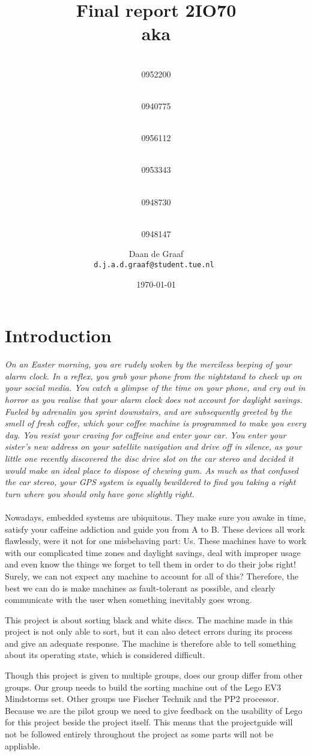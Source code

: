 \documentclass[a4paper,oneside,11pt]{report}
\title{\vspace{-\baselineskip}\sffamily\bfseries \Huge{ Final report 2IO70}
\small \\aka \\ \naam
}
\author{
	\makebox[.25\linewidth]{Sergio van Amerongen}\\0952200 \and
	\makebox[.25\linewidth]{Stefan Cloudt}\\0940775 \and
	\makebox[.25\linewidth]{Daan de Graaf}\\0956112 \and
	\makebox[.25\linewidth]{Robert van Lente}\\0953343 \and
	\makebox[.25\linewidth]{Tom Peters}\\0948730 \and
	\makebox[.25\linewidth]{Berrie Trippe}\\0948147 
	\and \makebox[.75\linewidth]{\textbf{Responsible:}} \and
	Daan de Graaf\\ \tt{d.j.a.d.graaf@student.tue.nl}
}
\date{\today}
\begin{document}
\maketitle

\tableofcontents
\newpage

\chapter{Introduction}
\textit{
On an Easter morning, you are rudely woken by the merciless beeping of your alarm clock. In a reflex, you grab your phone from the nightstand to check up on your social media. You catch a glimpse of the time on your phone, and cry out in horror as you realise that your alarm clock does not account for daylight savings. Fueled by adrenalin you sprint downstairs, and are subsequently greeted by the smell of fresh coffee, which your coffee machine is programmed to make you every day. You resist your craving for caffeine and enter your car. You enter your sister's new address on your satellite navigation and drive off in silence, as your little one recently discovered the disc drive slot on the car stereo and decided it would make an ideal place to dispose of chewing gum. As much as that confused the car stereo, your GPS system is equally bewildered to find you taking a right turn where you should only have gone slightly right.
}
\\\\
Nowadays, embedded systems are ubiquitous. They make sure you awake in time, satisfy your caffeine addiction and guide you from A to B. These devices all work flawlessly, were it not for one misbehaving part: Us. These machines have to work with our complicated time zones and daylight savings, deal with improper usage and even know the things we forget to tell them in order to do their jobs right! Surely, we can not expect any machine to account for all of this? Therefore, the best we can do is make machines as fault-tolerant as possible, and clearly communicate with the user when something inevitably goes wrong.

This project is about sorting black and white discs. The machine made in this project is not only able to sort, but it can also detect errors during its process and give an adequate response. The machine is therefore able to tell something about its operating state, which is considered difficult.

Though this project is given to multiple groups, does our group differ from other groups. Our group needs to build the sorting machine out of the Lego EV3 Mindstorms set. Other groups use Fischer Technik and the PP2 processor. Because we are the pilot group we need to give feedback on the usability of Lego for this project beside the project itself. This means that the projectguide will not be followed entirely throughout the project as some parts will not be appliable.
\end{document}
